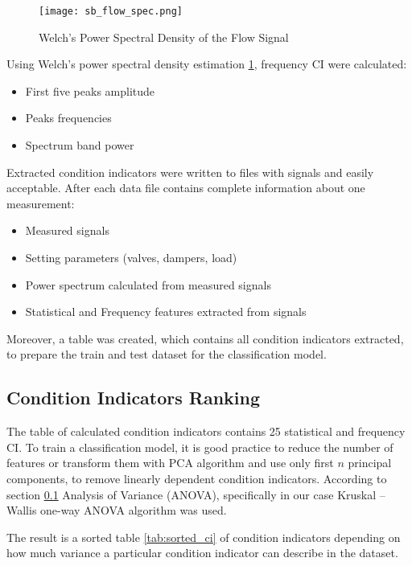 \begin{figure}[h!]
    \centering
    \texttt{[image: sb\_flow\_spec.png]}
    \caption{Welch's Power Spectral Density of the Flow Signal}
    \label{fig:flow_sp}
\end{figure}


Using Welch's power spectral density estimation \ref{fig:flow_sp}, frequency CI were
calculated: 

\begin{itemize}
\item First five peaks amplitude
\item Peaks frequencies
\item Spectrum band power
\end{itemize}


Extracted condition indicators were written to files with signals and
easily acceptable. After each data file contains complete information about
one measurement:
\begin{itemize}
    \item Measured signals
    \item Setting parameters (valves, dampers, load)
    \item Power spectrum calculated from measured signals
    \item Statistical and Frequency features extracted from signals
\end{itemize}

Moreover, a table was created, which contains all condition indicators
extracted, to prepare the train and test dataset for the classification
model.

\subsection{Condition Indicators Ranking}
The table of calculated condition indicators contains 25 statistical and
frequency CI. To train a classification model, it is good practice to
reduce the number of features or transform them with PCA algorithm and use
only first $n$ principal components, to remove linearly dependent condition
indicators.  According to section \ref{} Analysis of Variance (ANOVA),
specifically in our case Kruskal – Wallis one-way ANOVA algorithm was used. 


The result is a sorted table \ref{tab:sorted_ci} of condition indicators depending on
how much variance a particular condition indicator can describe in the
dataset.

